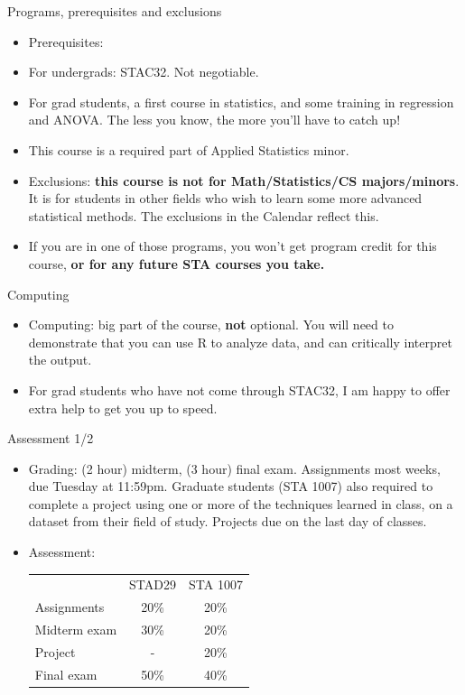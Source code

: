 \documentclass[ignorenonframetext,]{beamer}
\begin{document}
\begin{frame}{Programs, prerequisites and exclusions}
\protect\hypertarget{programs-prerequisites-and-exclusions}{}

\begin{itemize}
\item
  Prerequisites:
\item
  For undergrads: STAC32. Not negotiable.
\item
  For grad students, a first course in statistics, and some training in
  regression and ANOVA. The less you know, the more you'll have to catch
  up!
\item
  This course is a required part of Applied Statistics minor.
\item
  Exclusions: \textbf{this course is not for Math/Statistics/CS
  majors/minors}. It is for students in other fields who wish to learn
  some more advanced statistical methods. The exclusions in the Calendar
  reflect this.
\item
  If you are in one of those programs, you won't get program credit for
  this course, \textbf{or for any future STA courses you take.}
\end{itemize}

\end{frame}

\begin{frame}{Computing}
\protect\hypertarget{computing}{}

\begin{itemize}
\item
  Computing: big part of the course, \textbf{not} optional. You will
  need to demonstrate that you can use R to analyze data, and can
  critically interpret the output.
\item
  For grad students who have not come through STAC32, I am happy to
  offer extra help to get you up to speed.
\end{itemize}

\end{frame}

\begin{frame}{Assessment 1/2}
\protect\hypertarget{assessment-12}{}

\begin{itemize}
\item
  Grading: (2 hour) midterm, (3 hour) final exam. Assignments most
  weeks, due Tuesday at 11:59pm. Graduate students (STA 1007) also
  required to complete a project using one or more of the techniques
  learned in class, on a dataset from their field of study. Projects due
  on the last day of classes.
\item
  Assessment:

  \begin{tabular}{lcc}
  & STAD29 & STA 1007\\
  Assignments & 20\% & 20\%\\
  Midterm exam & 30\%  & 20\% \\
  Project & - & 20\%\\
  Final exam & 50\% & 40\%
  \end{tabular}
\end{itemize}

\end{frame}
\end{document}
